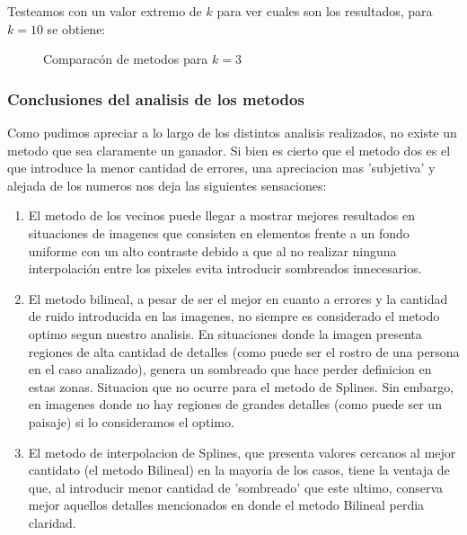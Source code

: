 Testeamos con un valor extremo de $k$ para ver cuales son los resultados, para $k=10$ se obtiene:

\begin{figure}[H]
    \centering
    \qquad
    \qquad
    \caption{Comparacón de metodos para $k = 3$}%
    \label{fig:example}%
\end{figure}

\subsubsection{Conclusiones del analisis de los metodos}
Como pudimos apreciar a lo largo de los distintos analisis realizados, no existe un metodo que sea claramente un ganador.
Si bien es cierto que el metodo dos es el que introduce la menor cantidad de errores, una apreciacion mas 'subjetiva' y alejada de los numeros nos deja las siguientes sensaciones:
\begin{enumerate}
 \item El metodo de los vecinos puede llegar a mostrar mejores resultados en situaciones de imagenes que consisten en elementos frente a un fondo uniforme con un alto contraste debido a que al no realizar ninguna interpolación entre los pixeles evita introducir sombreados innecesarios.
 \item El metodo bilineal, a pesar de ser el mejor en cuanto a errores y la cantidad de ruido introducida en las imagenes, no siempre es considerado el metodo optimo segun nuestro analisis. En situaciones donde la imagen presenta regiones de alta cantidad de detalles (como puede ser el rostro de una persona en el caso analizado), genera un sombreado que hace perder definicion en estas zonas. Situacion que no ocurre para el metodo de Splines. Sin embargo, en imagenes donde no hay regiones de grandes detalles (como puede ser un paisaje) si lo consideramos el optimo.
 \item El metodo de interpolacion de Splines, que presenta valores cercanos al mejor cantidato (el metodo Bilineal) en la mayoria de los casos, tiene la ventaja de que, al introducir menor cantidad de 'sombreado' que este ultimo, conserva mejor aquellos detalles mencionados en donde el metodo Bilineal perdia claridad.
\end{enumerate}


